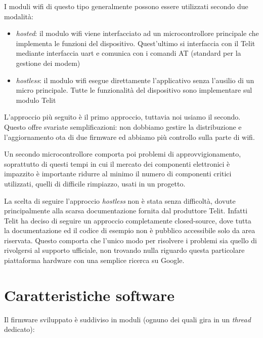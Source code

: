 \documentclass[12pt,a4paper,twoside,titlepage]{book}
\begin{document}
I moduli \Gls{wifi} di questo tipo generalmente possono essere utilizzati secondo due modalità:
\begin{itemize}
    \item \textit{hosted}: il modulo \Gls{wifi} viene interfacciato ad un microcontrollore
        principale che implementa le funzioni del dispositivo. Quest'ultimo si interfaccia
        con il Telit mediante interfaccia \acrshort{uart} e comunica con i comandi AT (standard
        per la gestione dei modem)
    \item \textit{hostless}: il modulo \Gls{wifi} esegue direttamente l'applicativo senza
        l'ausilio di un \gls{micro} principale. Tutte le funzionalità del dispositivo
        sono implementare sul modulo Telit
\end{itemize}

L'approccio più seguito è il primo approccio, tuttavia noi usiamo il secondo.
Questo offre svariate semplificazioni: non dobbiamo gestire la distribuzione
e l'aggiornamento \acrshort{ota} di due \gls{firmware} ed abbiamo più controllo sulla 
parte di \Gls{wifi}.

Un secondo microcontrollore comporta poi problemi di approvvigionamento, soprattutto di
questi tempi in cui il mercato dei componenti elettronici è impazzito è importante ridurre 
al minimo il numero di componenti critici utilizzati, quelli di difficile rimpiazzo, usati in un progetto.

La scelta di seguire l'approccio \textit{hostless} non è stata senza difficoltà, dovute
principalmente alla scarsa documentazione fornita dal produttore Telit. Infatti 
Telit ha deciso di seguire un approccio completamente closed-source, dove tutta
la documentazione ed il codice di esempio non è pubblico accessibile solo da area riservata.
Questo comporta che l'unico modo per risolvere i problemi sia quello di rivolgersi
al supporto ufficiale, non trovando nulla riguardo questa particolare piattaforma
hardware con una semplice ricerca su Google.

\section{Caratteristiche software}

Il \gls{firmware} sviluppato è suddiviso in moduli (ognuno dei quali gira in un \textit{thread} dedicato):
\end{document}
